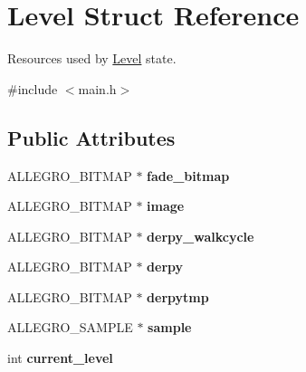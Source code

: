 \hypertarget{structLevel}{\section{\-Level \-Struct \-Reference}
\label{structLevel}
}


\-Resources used by \hyperlink{structLevel}{\-Level} state.  




{\ttfamily \#include $<$main.\-h$>$}

\subsection*{\-Public \-Attributes}
\begin{DoxyCompactItemize}
\item 
\hypertarget{structLevel_a1a9629222f6536790772ad7af5d2413c}{\-A\-L\-L\-E\-G\-R\-O\-\_\-\-B\-I\-T\-M\-A\-P $\ast$ {\bfseries fade\-\_\-bitmap}}\label{structLevel_a1a9629222f6536790772ad7af5d2413c}

\item 
\hypertarget{structLevel_a29a3fe4b6d80ae62843840aa6afa0596}{\-A\-L\-L\-E\-G\-R\-O\-\_\-\-B\-I\-T\-M\-A\-P $\ast$ {\bfseries image}}\label{structLevel_a29a3fe4b6d80ae62843840aa6afa0596}

\item 
\hypertarget{structLevel_ab6a78c50cda8424f722ca249f5466f67}{\-A\-L\-L\-E\-G\-R\-O\-\_\-\-B\-I\-T\-M\-A\-P $\ast$ {\bfseries derpy\-\_\-walkcycle}}\label{structLevel_ab6a78c50cda8424f722ca249f5466f67}

\item 
\hypertarget{structLevel_ae33832497116b7a0c184959bbde21ee5}{\-A\-L\-L\-E\-G\-R\-O\-\_\-\-B\-I\-T\-M\-A\-P $\ast$ {\bfseries derpy}}\label{structLevel_ae33832497116b7a0c184959bbde21ee5}

\item 
\hypertarget{structLevel_ac21ed7629a60287bf8612f98abd3d9b6}{\-A\-L\-L\-E\-G\-R\-O\-\_\-\-B\-I\-T\-M\-A\-P $\ast$ {\bfseries derpytmp}}\label{structLevel_ac21ed7629a60287bf8612f98abd3d9b6}

\item 
\hypertarget{structLevel_a234fa7b9ec35dd360e4e3c48a944fc7d}{\-A\-L\-L\-E\-G\-R\-O\-\_\-\-S\-A\-M\-P\-L\-E $\ast$ {\bfseries sample}}\label{structLevel_a234fa7b9ec35dd360e4e3c48a944fc7d}

\item 
\hypertarget{structLevel_a1ba3ee0104c912dde5d6e70fee889512}{int {\bfseries current\-\_\-level}}\label{structLevel_a1ba3ee0104c912dde5d6e70fee889512}


\end{DoxyCompactItemize}
